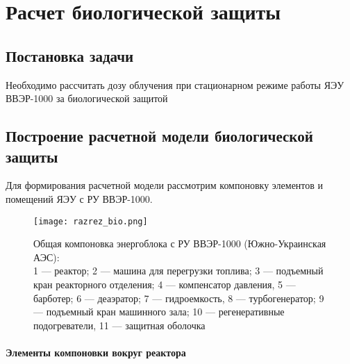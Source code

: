 \section{Расчет биологической защиты} %
\subsection{Постановка задачи}
Необходимо рассчитать дозу облучения при стационарном режиме работы ЯЭУ ВВЭР-1000 за биологической защитой

\subsection{Построение расчетной модели биологической защиты}
Для формирования расчетной модели рассмотрим компоновку элементов и помещений ЯЭУ с РУ ВВЭР-1000.

\begin{figure}[H]
	\begin{center}
		\texttt{[image: razrez\_bio.png]}
		\caption{
			Общая компоновка энергоблока с РУ ВВЭР-1000 (Южно-Украинская АЭС): \\
			1 — реактор; 2 — машина для перегрузки топлива; 3 — подъемный кран реакторного отделения; 4 — компенсатор давления, 5 — барботер; 6 — деаэратор; 7 — гидроемкость, 8 — турбогенератор; 9 — подъемный кран машинного зала; 10 — регенеративные подогреватели, 11 —  защитная оболочка
		}
		\label{pic:razrez_bio} %
	\end{center}
\end{figure}

\paragraph{Элементы компоновки вокруг реактора}

